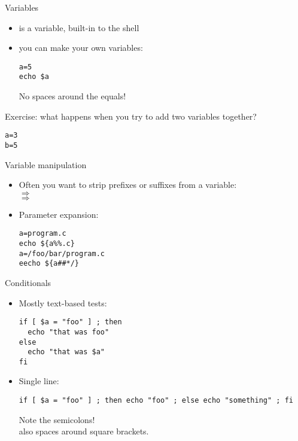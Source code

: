 \documentclass[11pt,headernav]{beamer}
\begin{document}
\begin{numberedframe}{Variables}
  \label{sl-lnx:var}
  \begin{itemize}
  \item {} is a variable, built-in to the shell
    \item you can make your own variables:
\begin{verbatim}
a=5
echo $a
\end{verbatim}
No spaces around the equals!
  \end{itemize}
Exercise: what happens when you try to add two variables together?
\begin{verbatim}
a=3
b=5
\end{verbatim}
\end{numberedframe}

\begin{numberedframe}{Variable manipulation}
  \begin{itemize}
  \item Often you want to strip prefixes or suffixes from a variable:\\
     $\Rightarrow$ \\
     $\Rightarrow$ 
  \item Parameter expansion:
\begin{verbatim}
a=program.c
echo ${a%%.c}
a=/foo/bar/program.c
eecho ${a##*/}
\end{verbatim}
  \end{itemize}
\end{numberedframe}

\begin{numberedframe}{Conditionals}
  \label{sl-lnx:if}
\begin{itemize}
  \item Mostly text-based tests:
\begin{verbatim}
if [ $a = "foo" ] ; then
  echo "that was foo"
else
  echo "that was $a"
fi
\end{verbatim}
\item Single line:
{  \footnotesize
\begin{verbatim}
if [ $a = "foo" ] ; then echo "foo" ; else echo "something" ; fi
\end{verbatim}
}
Note the semicolons!\\
also spaces around square brackets.
  \end{itemize}
\end{numberedframe}
\end{document}

